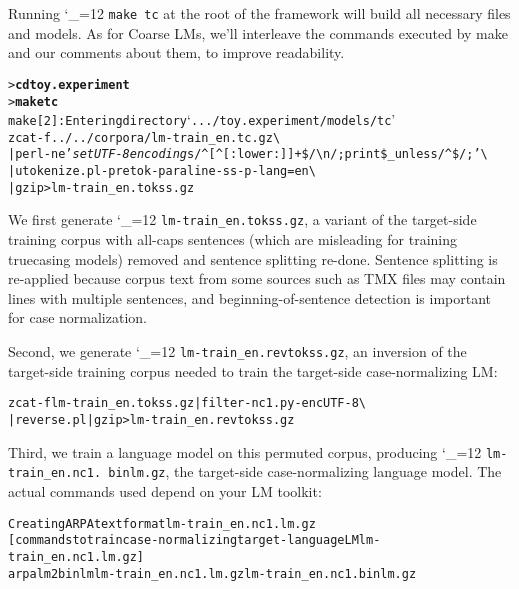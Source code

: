 \documentclass[11pt,letterpaper]{article}
\newcommand{\bs}{\textbackslash{}}
\newcommand{\TODO}[1]{\emph{\textbf{\textcolor{red}{<TODO> #1 </TODO>}}}}
\def\code{\begingroup\catcode`\_=12 \codex}
\newcommand{\codex}[1]{\texttt{#1}\endgroup}
\begin{document}

Running \code{make tc} at the root of the framework will build all necessary
files and models.  As for Coarse LMs, we'll
interleave the commands executed by make and our comments about them, to
improve readability.

\begin{small}
\begin{alltt}
   > \textbf{cd toy.experiment}
   > \textbf{make tc}
   make[2]: Entering directory `.../toy.experiment/models/tc'
   zcat -f ../../corpora/lm-train_en.tc.gz \bs
        | perl -ne '\emph{set UTF-8 encoding} s/^[^[:lower:]]+\$/{\bs}n/; print \$_ unless /^\$/;' \bs
        | utokenize.pl -pretok -paraline -ss -p -lang=en \bs
        | gzip > lm-train_en.tokss.gz
\end{alltt}
\end{small}

We first generate \code{lm-train_en.tokss.gz}, a variant of the target-side
training corpus with all-caps sentences (which are misleading for training
truecasing models) removed and sentence splitting re-done.  Sentence splitting
is re-applied because corpus text from some sources such as TMX files may
contain lines with multiple sentences, and beginning-of-sentence detection is
important for case normalization.

Second, we generate \code{lm-train_en.revtokss.gz}, an inversion of the
target-side training corpus needed to train the target-side case-normalizing
LM:

\begin{small}
\begin{alltt}
   zcat -f lm-train_en.tokss.gz | filter-nc1.py -enc UTF-8 \bs
        | reverse.pl | gzip > lm-train_en.revtokss.gz
\end{alltt}
\end{small}

Third, we train a language model on this permuted corpus, producing
\code{lm-train_en.nc1. binlm.gz}, the target-side case-normalizing language model.
The actual commands used depend on your LM toolkit:

\begin{small}
\begin{alltt}
   Creating ARPA text format lm-train_en.nc1.lm.gz
   [commands to train case-normalizing target-language LM lm-train_en.nc1.lm.gz]
   arpalm2binlm lm-train_en.nc1.lm.gz lm-train_en.nc1.binlm.gz
\end{alltt}
\end{small}
\end{document}
